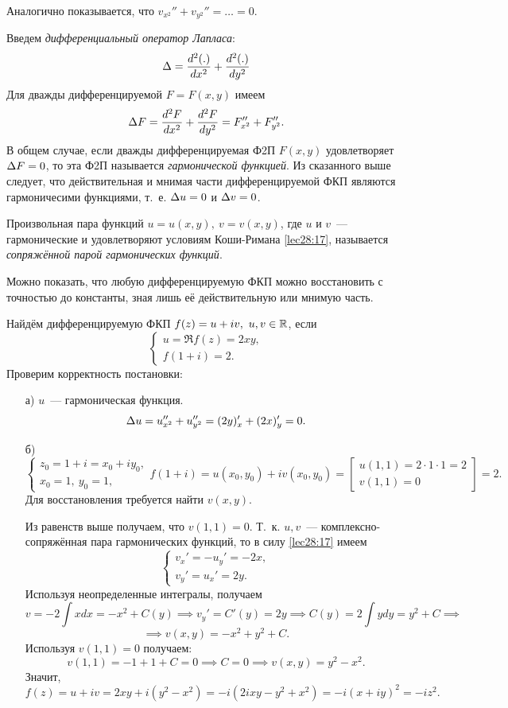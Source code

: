 \documentclass[../../main.tex]{subfiles}
\begin{document}
Аналогично показывается, что $ v_{x^2}'' + v_{y^2}'' = \dots = 0 $.

Введем \emph{дифференциальный оператор Лапласа}:
\[
\Delta = \dfrac{d^2 (.)}{d x^2} + \dfrac{d^2(.)}{d y^2}
\]
Для дважды дифференцируемой $ F = F(x, y) $ имеем\[
\Delta F = \dfrac{d^2 F}{d x^2} + \dfrac{d^2 F}{d y^2} = 
F_{x^2}'' + F_{y^2}''.
\]
В общем случае, если дважды дифференцируемая Ф2П $ F(x, y) $
удовлетворяет $ \Delta F = 0 $, то эта Ф2П называется \emph{гармонической 
функцией}.
Из сказанного выше следует, что действительная и мнимая части 
дифференцируемой ФКП являются гармоничесими функциями, т.~е.
$ \Delta u = 0$ и $\Delta v = 0 $.

Произвольная пара функций $ u = u(x, y),\ v = v(x, y) $, где $u$ и $v$~--- 
гармонические и 
удовлетворяют условиям Коши-Римана \eqref{lec28:17},
называется \emph{сопряжённой парой гармонических функций}.

Можно показать, что любую дифференцируемую ФКП можно восстановить с точностью 
до константы, зная лишь её действительную или мнимую часть.
\begin{exmp}
Найдём дифференцируемую ФКП $ f(z) = u + iv,\ u, v\in \mathbb{R} $,
если \[\begin{cases}u = \Re f(z) = 2xy, \\ f(1 + i) = 2. \end{cases}\]
Проверим корректность постановки:
\begin{enumerate}
	\item[а)] $ u $~--- гармоническая функция.
	\[\Delta u = u_{x^2}'' + u_{y^2}'' = (2y)_x' + (2x)_y' = 0. \]
	\item[б)] \[
	\begin{cases}
		z_0 = 1 + i = x_0 + iy_0,\\
		x_0 = 1,\ y_0 = 1,
	\end{cases}
	f(1 + i) = u(x_0, y_0) + iv(x_0, y_0) = \left[
	\begin{gathered}
		u(1, 1) = 2\cdot1\cdot1 = 2\\
		v(1, 1) = 0
	\end{gathered}
	\right] = 2.
	\]
	Для восстановления требуется найти $ v(x, y) $.
	
	Из равенств выше получаем, что $ v(1, 1) = 0 $.
	Т.~к. $ u, v $~--- комплексно-сопряжённая пара
	гармонических функций, то в силу \eqref{lec28:17} имеем
	\[
	\begin{cases}
		v_x' = -u_y' = -2x,\\
		v_y' = u_x' = 2y.
	\end{cases}
	\]
	Используя неопределенные интегралы, получаем \[ 
	v = -2\int x dx = -x^2 + C(y) 
	\implies v_y' = C'(y) = 2y \implies 
	C(y) = 2\int y dy = y^2 + C \implies \]\[ \implies
	v(x, y) = -x^2 + y^2 + C.
	\]
	Используя $ v(1, 1) = 0$ получаем:
	\[v(1, 1) = -1 + 1 + C = 0 \implies C = 0 \implies 
	v(x, y) = y^2 - x^2.\]
	Значит, \[ f(z) = u + iv = 2xy + i(y^2 - x^2) =
	-i(2ixy - y^2 + x^2) = -i(x + iy)^2 = -iz^2.\]
\end{enumerate}
\end{exmp}
\end{document}
